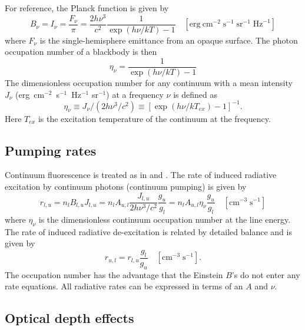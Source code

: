 For reference, the Planck function is given by
\begin{equation}
{B_\nu } = {I_\nu } = \frac{{{F_\nu }}}{\pi } = \frac{{2h{\nu
^3}}}{{{c^2}}}\frac{1}{{\exp \left( {h\nu /kT} \right) - 1}}
\quad  [\mathrm{erg~cm}^{-2}\;\mathrm{s}^{-1}\; \mathrm{sr}^{-1}\; \mathrm{Hz}^{-1}]%
\end{equation}
where $F_\nu$ is the single-hemisphere emittance from an opaque surface.
The photon occupation number of a blackbody is then
\begin{equation}
\label{eqn:PhotonOccupationNumber}
{\eta _\nu } = \frac{1}{{\exp \left( {h\nu /kT} \right) - 1}}
\end{equation}
The dimensionless occupation number for any continuum with a mean intensity
$J_\nu$ (erg~cm$^{-2}$~s$^{-1}$~Hz$^{-1}$ sr$^{-1}$) at a frequency $\nu$ is defined as
\begin{equation}
{\eta _\nu } \equiv {J_\nu }/\left( {2h{\nu ^3}/{c^2}} \right) \equiv
{\left[ {\exp \left( {h\nu /k{T_{ex}}} \right) - 1} \right]^{ - 1}}
.
\end{equation}
Here $T_{ex}$ is the excitation temperature of the continuum at the frequency.

\subsection{Pumping rates}

Continuum fluorescence is treated as in \citet{Ferland1988} and \citet{Ferland1992}.
The rate of induced radiative excitation by continuum photons
(continuum pumping) is given by
\begin{equation}
{r_{l,u}} = {n_l}{B_{l,u}}{J_{l,u}} =
{n_l}{A_{u,l}}\frac{{{J_{l,u}}}}{{2h{\nu ^3}/{c^2}}}\frac{{{g_u}}}{{{g_l}}}
= {n_l}{A_{u,l}}{\eta _\nu }\frac{{{g_u}}}{{{g_l}}}
\quad [\mathrm{cm}^{-3}\;\mathrm{s}^{-1}]
\end{equation}
where $\eta_\nu$ is the dimensionless continuum occupation number
at the line energy.
The rate of induced radiative de-excitation is related by
detailed balance and is given by
\begin{equation}
{r_{u,l}} = {r_{l,u}}\frac{{{g_l}}}{{{g_u}}}
\quad [\mathrm{cm}^{-3} \;\mathrm{s}^{-1}].
\end{equation}
The occupation number has the advantage that the Einstein $B$'s
do not enter any rate equations.
All radiative rates can be expressed in terms of an
$A$ and $\nu$.

\subsection{Optical depth effects}

